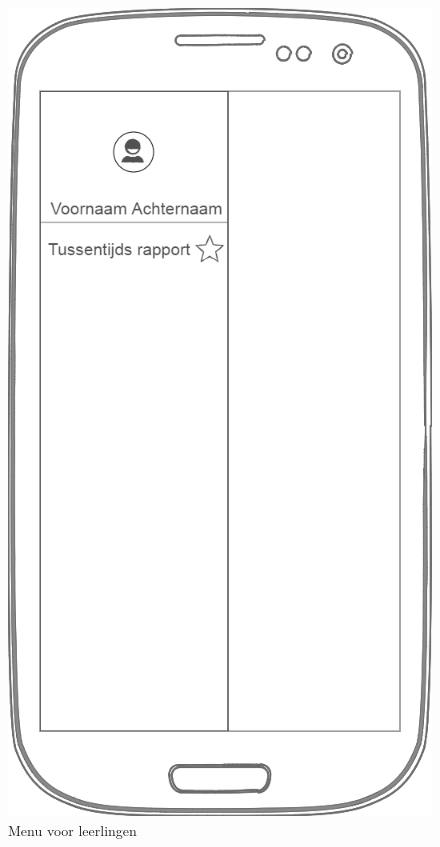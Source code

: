 \documentclass[a4paper]{article}
\begin{document}
\begin{appendices}
\begin{figure}[H]
  \centerline{\includegraphics[width=\textwidth*4/5]{MobieleApp/leerling_view}}
  \caption{Menu voor leerlingen}
  \label{fig:mobiel_leerling}
\end{figure}


\end{appendices}
\end{document}
